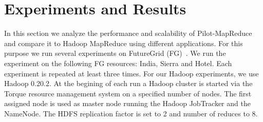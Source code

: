\documentclass{sig-alternate}
\newcommand{\alnote}[1]{ {\textcolor{blue} { ***andreL: #1 }}}
\newcommand{\alnote}[1]{}
\newcommand{\upp}{\vspace*{-0.5em}}
\newcommand{\pilotmapreduce}{Pilot-MapReduce\xspace}
\begin{document}





\upp
\section{Experiments and Results}
\label{sec-experiments}


In this section we analyze the performance and scalability of
\pilotmapreduce and compare it to Hadoop MapReduce using different
applications. For this purpose we run several experiments on
FutureGrid (FG)~\cite{fg}. We run the experiment on the following FG
resources: India, Sierra and Hotel. Each experiment is repeated at
least three times. For our Hadoop experiments, we use Hadoop
0.20.2. At the begining of each run a Hadoop cluster is started via
the Torque resource management system on a specified number of
nodes. The first assigned node is used as master node running the
Hadoop JobTracker and the NameNode. The HDFS replication factor is set
to 2 and number of reduces to 8.  \upp
\end{document}
